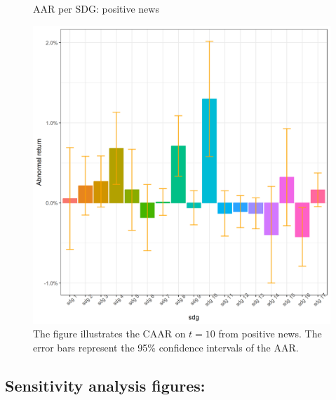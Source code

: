 \begin{figure} [H]
    \centering
    \caption{AAR per SDG: positive news}
    \includegraphics[scale=0.6]{Projekt/1.Figures analysis/ST_positive_sdg_bar.png}
    \caption*{\footnotesize The figure illustrates the CAAR on $t = 10$ from positive news. The error bars represent the 95\% confidence intervals of the AAR.}
    \label{fig:ST_pos_bar_all}
\end{figure}












\subsection{Sensitivity analysis figures:} \label{app: sensitivity}



